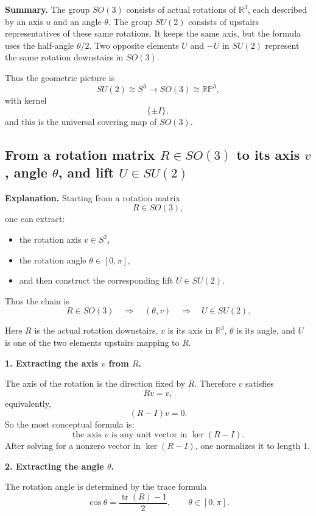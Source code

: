 \documentclass[12pt,a4paper]{article}
\theoremstyle{notespace}
\begin{document}
\textbf{Summary.}
The group \(SO(3)\) consists of actual rotations of \(\mathbb R^3\), each described by an axis \(u\) and an angle \(\theta\). The group \(SU(2)\) consists of upstairs representatives of these same rotations. It keeps the same axis, but the formula uses the half-angle \(\theta/2\). Two opposite elements \(U\) and \(-U\) in \(SU(2)\) represent the same rotation downstairs in \(SO(3)\).

Thus the geometric picture is
\[
SU(2)\cong S^3
\longrightarrow
SO(3)\cong \mathbb{RP}^3,
\]
with kernel
\[
\{\pm I\},
\]
and this is the universal covering map of \(SO(3)\).	


\subsection{From a rotation matrix \(R\in SO(3)\) to its axis \(v\), angle \(\theta\), and lift \(U\in SU(2)\)}

\textbf{Explanation.}
Starting from a rotation matrix
\[
R\in SO(3),
\]
one can extract:

\begin{itemize}
	\item the rotation axis \(v\in S^2\),
	\item the rotation angle \(\theta\in[0,\pi]\),
	\item and then construct the corresponding lift \(U\in SU(2)\).
\end{itemize}

Thus the chain is
\[
R\in SO(3)
\quad\Longrightarrow\quad
(\theta,v)
\quad\Longrightarrow\quad
U\in SU(2).
\]

Here \(R\) is the actual rotation downstairs, \(v\) is its axis in \(\mathbb R^3\), \(\theta\) is its angle, and \(U\) is one of the two elements upstairs mapping to \(R\).

\medskip

\textbf{1. Extracting the axis \(v\) from \(R\).}

The axis of the rotation is the direction fixed by \(R\). Therefore \(v\) satisfies
\[
Rv=v,
\]
equivalently,
\[
(R-I)v=0.
\]
So the most conceptual formula is:
\[
\boxed{\text{the axis }v\text{ is any unit vector in }\ker(R-I).}
\]
After solving for a nonzero vector in \(\ker(R-I)\), one normalizes it to length \(1\).

\medskip

\textbf{2. Extracting the angle \(\theta\).}

The rotation angle is determined by the trace formula
\[
\boxed{\cos\theta=\frac{\operatorname{tr}(R)-1}{2}},
\qquad
\theta\in[0,\pi].
\]
\end{document}
